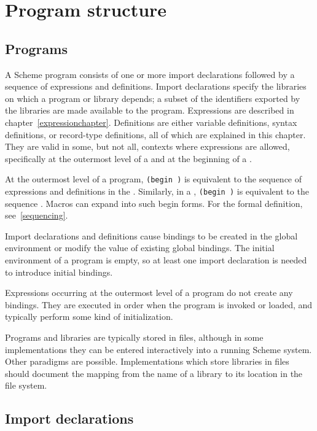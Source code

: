 
\chapter{Program structure}
\label{programchapter}

\section{Programs}

A Scheme program consists of
one or more import declarations followed by a sequence of
expressions and definitions.
Import declarations specify the libraries on which a program or library depends;
a subset of the identifiers exported by the libraries are made available to
the program.
Expressions are described in chapter~\ref{expressionchapter}.
Definitions are either variable definitions, syntax definitions, or
record-type definitions, all of which are explained in this chapter.
They are valid in some, but not all, contexts where expressions
are allowed, specifically at the outermost level of a 
and at the beginning of a .

At the outermost level of a program, {\tt(begin  \dotsfoo)} is
equivalent to the sequence of expressions and definitions
in the .
Similarly, in a , {\tt(begin  \dotsfoo)} is equivalent
to the sequence  \dotsfoo.
Macros can expand into such {\cf begin} forms.
For the formal definition, see~\ref{sequencing}.

Import declarations and definitions
cause bindings to be created in the global
environment or modify the value of existing global bindings.
The initial environment of a program is empty,
so at least one import declaration is needed to introduce initial bindings.

Expressions occurring at the outermost level of a program
do not create any bindings.  They are
executed in order when the program is
invoked or loaded, and typically perform some kind of initialization.


Programs and libraries are typically stored in files, although
in some implementations they can be entered interactively into a running
Scheme system.  Other paradigms are possible.
Implementations which store libraries in files should document the
mapping from the name of a library to its location in the file system.

\section{Import declarations}


